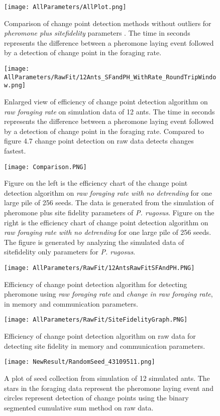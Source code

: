 \begin{figure}[H]
	\texttt{[image: AllParameters/AllPlot.png]}
	\caption{Comparison of change point detection methods without outliers for \textit{pheromone plus sitefidelity} parameters . The time in seconds represents the difference between a pheromone laying event followed by a detection of change point in the foraging rate.}
\end{figure}
\begin{figure}
	\texttt{[image: AllParameters/RawFit/12Ants\_SFandPH\_WithRate\_RoundTripWindow.png]}
	\caption{Enlarged view of efficiency of change point detection algorithm on \textit{raw foraging rate} on simulation data of 12 ants. The time in seconds represents the difference between a pheromone laying event followed by a detection of change point in the foraging rate. Compared to figure 4.7 change point detection on raw data detects changes fastest.}
\end{figure}
\begin{figure}[h]
		\centering
		\texttt{[image: Comparison.PNG]}
	\caption{Figure on the left is the efficiency chart of the change point detection algorithm on \textit{raw foraging rate with no detrending} for one large pile of 256 seeds. The data is generated from the simulation of pheromone plus site fidelity parameters of \textit{P. rugosus}. 
		Figure on the right is the efficiency chart of change point detection algorithm on \textit{raw foraging rate with no detrending} for one large pile of 256 seeds. The figure is generated by analyzing the simulated data of sitefidelity only parameters for \textit{P. rugosus}. }
	\label{fig:fig}
\end{figure}
\begin{figure}
	\texttt{[image: AllParameters/RawFit/12AntsRawFitSFAndPH.PNG]}
	\caption{Efficiency of change point detection algorithm for detecting pheromone using\textit{ raw foraging rate} and \textit{change in raw foraging rate}, in memory and communication parameters.}
\end{figure}
\begin{figure}
	\texttt{[image: AllParameters/RawFit/SiteFidelityGraph.PNG]}
	\caption{Efficiency of change point detection algorithm on raw data for detecting site fidelity in memory and communication parameters.}
\end{figure}
\begin{figure}[h]
	\texttt{[image: NewResult/RandomSeed\_43109511.png]}
	\caption{A plot of seed collection from simulation of 12 simulated ants. The stars in the foraging data represent the pheromone laying event and circles represent detection of change points using the binary segmented cumulative sum method on raw data.}
\end{figure}
